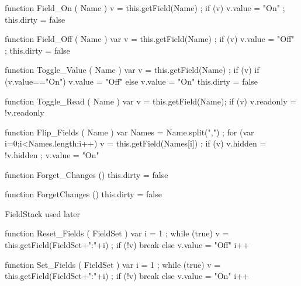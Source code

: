 function Field_On ( Name )
  { v = this.getField(Name) ;
    if (v) { v.value = "On" ; this.dirty = false } }

function Field_Off ( Name )
  { var v = this.getField(Name) ;
    if (v) { v.value = "Off" ; this.dirty = false } }

function Toggle_Value ( Name )
  { var v = this.getField(Name) ;
    if (v)
      { if (v.value=="On")
          { v.value = "Off" }
        else
          { v.value = "On" } }
   this.dirty = false }

function Toggle_Read ( Name )
  { var v = this.getField(Name);
    if (v) { v.readonly = !v.readonly } }

function Flip_Fields ( Name )
  { var Names = Name.split(",") ;
    for (var i=0;i<Names.length;i++)
      { v = this.getField(Names[i]) ;
        if (v)
          { v.hidden = !v.hidden ;
            v.value = "On" } } }

function Forget_Changes ()
  { this.dirty = false }

function ForgetChanges ()
  { this.dirty = false }

\stopJSpreamble

%



\startJSpreamble FieldStack used later

function Reset_Fields ( FieldSet )
  { var i = 1 ;
    while (true)
      { v = this.getField(FieldSet+":"+i) ;
        if (!v)
          { break }
        else
          { v.value = "Off" }
        i++ } }

function Set_Fields ( FieldSet )
  { var i = 1 ;
    while (true)
      { v = this.getField(FieldSet+":"+i) ;
        if (!v)
          { break }
        else
          { v.value = "On" }
        i++ } }


